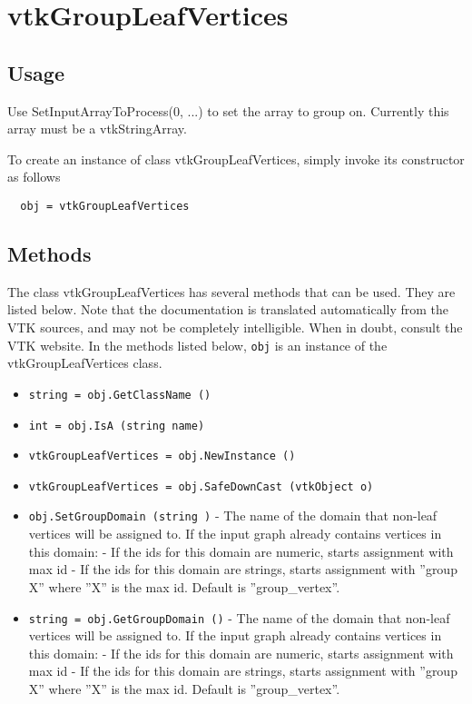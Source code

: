 \section{vtkGroupLeafVertices}

\subsection{Usage}

 Use SetInputArrayToProcess(0, ...) to set the array to group on.
 Currently this array must be a vtkStringArray.

To create an instance of class vtkGroupLeafVertices, simply
invoke its constructor as follows
\begin{verbatim}
  obj = vtkGroupLeafVertices
\end{verbatim}
\subsection{Methods}

The class vtkGroupLeafVertices has several methods that can be used.
  They are listed below.
Note that the documentation is translated automatically from the VTK sources,
and may not be completely intelligible.  When in doubt, consult the VTK website.
In the methods listed below, \verb|obj| is an instance of the vtkGroupLeafVertices class.
\begin{itemize}
\item  \verb|string = obj.GetClassName ()|

\item  \verb|int = obj.IsA (string name)|

\item  \verb|vtkGroupLeafVertices = obj.NewInstance ()|

\item  \verb|vtkGroupLeafVertices = obj.SafeDownCast (vtkObject o)|

\item  \verb|obj.SetGroupDomain (string )| -  The name of the domain that non-leaf vertices will be assigned to.
 If the input graph already contains vertices in this domain:
 - If the ids for this domain are numeric, starts assignment with max id
 - If the ids for this domain are strings, starts assignment with ''group X''
   where ''X'' is the max id.
 Default is ''group\_vertex''.

\item  \verb|string = obj.GetGroupDomain ()| -  The name of the domain that non-leaf vertices will be assigned to.
 If the input graph already contains vertices in this domain:
 - If the ids for this domain are numeric, starts assignment with max id
 - If the ids for this domain are strings, starts assignment with ''group X''
   where ''X'' is the max id.
 Default is ''group\_vertex''.

\end{itemize}
